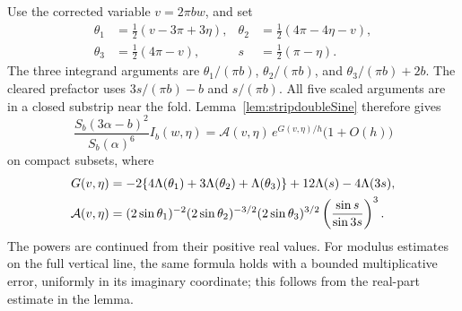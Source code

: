 Use the corrected variable $v=2\pi bw$, and set
\begin{equation}
 \begin{aligned}
 \theta_1&=\tfrac12(v-3\pi+3\eta),&
 \theta_2&=\tfrac12(4\pi-4\eta-v),\\
 \theta_3&=\tfrac12(4\pi-v),&
 s&=\tfrac12(\pi-\eta).
 \end{aligned}
 \label{eq:regularstripangles}
\end{equation}
The three integrand arguments are
$\theta_1/(\pi b)$, $\theta_2/(\pi b)$, and
$\theta_3/(\pi b)+2b$.
The cleared prefactor uses $3s/(\pi b)-b$ and $s/(\pi b)$.
All five scaled arguments are in a closed substrip near the fold.
Lemma~\ref{lem:stripdoubleSine} therefore gives
\begin{equation}
 \frac{S_b(3\alpha-b)^2}{S_b(\alpha)^6}I_b(w,\eta)
 =
 \mathcal A(v,\eta)\,e^{G(v,\eta)/h}
 \bigl(1+O(h)\bigr)
 \label{eq:fullsmoothquantumphase}
\end{equation}
on compact subsets, where
\begin{align}
 G(v,\eta)
 &=-2\{4\Lambda(\theta_1)+3\Lambda(\theta_2)
                              +\Lambda(\theta_3)\}
        +12\Lambda(s)-4\Lambda(3s),\notag\\
 \mathcal A(v,\eta)
 &=(2\sin\theta_1)^{-2}(2\sin\theta_2)^{-3/2}
   (2\sin\theta_3)^{3/2}
   \left(\frac{\sin s}{\sin3s}\right)^3.
 \label{eq:clearedphaseamplitude}
\end{align}
The powers are continued from their positive real values.
For modulus estimates on the full vertical line, the same formula
holds with a bounded multiplicative error, uniformly in its
imaginary coordinate; this follows from the real-part estimate
in the lemma.

